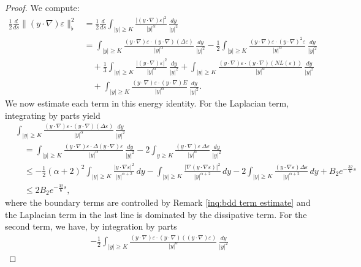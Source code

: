 \documentclass[11pt,reqno]{amsart}
\theoremstyle{definition}
\theoremstyle{bfremark}
\numberwithin{equation}{section}
\begin{document}
\begin{proof}
We compute:
\begin{align*}
    \frac{1}{2}\frac{d}{ds}\|(y \cdot \nabla)\varepsilon\|_{\flat}^2 
    &= \frac{1}{2}\frac{d}{ds}\int_{|y| \geq K}\frac{|(y \cdot \nabla)\varepsilon|^2}{|y|^{\alpha}}\,\frac{dy}{|y|^2} \\
    &= \int_{|y| \geq K}\frac{(y \cdot \nabla)\varepsilon \cdot (y \cdot \nabla)(\Delta \varepsilon)}{|y|^{\alpha}}\,\frac{dy}{|y|^2}
    - \frac{1}{2} \int_{|y| \geq K}\frac{(y \cdot \nabla)\varepsilon \cdot (y \cdot \nabla)^2\varepsilon}{|y|^{\alpha}}\,\frac{dy}{|y|^2} \\
    &\quad +\frac{1}{3} \int_{|y| \geq K}\frac{|(y \cdot \nabla)\varepsilon|^2}{|y|^{\alpha}}\,\frac{dy}{|y|^2} 
    + \int_{|y| \geq K}\frac{(y \cdot \nabla)\varepsilon \cdot (y \cdot \nabla)(NL(\varepsilon))}{|y|^{\alpha}}\,\frac{dy}{|y|^2}\\
    &\quad +\int_{|y| \geq K}\frac{(y \cdot \nabla) \varepsilon \cdot (y \cdot \nabla)E}{|y|^{\alpha}}\,\frac{dy}{|y|^2}.     
\end{align*}
We now estimate each term in this energy identity. For the Laplacian term, integrating by parts yield
\begin{align*}
    &\int_{|y| \geq K}\frac{(y \cdot \nabla)\varepsilon \cdot (y \cdot \nabla)(\Delta \varepsilon)}{|y|^{\alpha}}\,\frac{dy}{|y|^2}\\
    & \quad = \int_{|y| \geq K}\frac{(y \cdot \nabla) \varepsilon \cdot \Delta(y \cdot \nabla)
    \varepsilon}{|y|^{\alpha}}\,\frac{dy}{|y|^2}-2\int_{y \geq K}\frac{(y \cdot \nabla)\varepsilon \: \Delta\varepsilon}{|y|^{\alpha}}\,\frac{dy}{|y|^2}\\
    & \quad \leq -\frac{1}{2}(\alpha+2)^2 \int_{|y| \geq K}\frac{|y \cdot \nabla\varepsilon|^2}{|y|^{\alpha+2}}\,dy-\int_{|y| \geq K}\frac{|\nabla(y \cdot \nabla \varepsilon)|^2}{|y|^{\alpha+2}}\,dy-2\int_{|y| \geq K}\frac{(y \cdot \nabla \varepsilon) \Delta \varepsilon}{|y|^{\alpha+2}}\,dy + B_2e^{-\frac{32}{6}s} \\
    & \quad \leq 2B_2e^{-\frac{32}{6}s},
\end{align*}
where the boundary terms are controlled by Remark \ref{inq:bdd term estimate} and the Laplacian term in the last line is dominated by the dissipative term. For the second term, we have, by integration by parts
\begin{align*}
    -\frac{1}{2} \int_{|y| \geq K}\frac{(y \cdot \nabla)\varepsilon \cdot (y \cdot \nabla)((y \cdot \nabla)\varepsilon)}{|y|^{\alpha}}\,\frac{dy}{|y|^2} 

\end{align*}
\end{proof}
\end{document}
